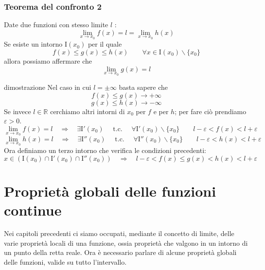 \documentclass[x11names]{article}
\begin{document}
	\begin{center}
		\colorbox{myred}{\begin{minipage}{5.75in}
				\begin{redes}{}
					\subsubsection{Teorema del confronto 2}
					Date due funzioni con stesso limite $l$ :
					\[
					\lim_{x \to x_0} f(x) = l = \lim_{x \to x_0} h(x)
					\]
					Se esiste un intorno $\text{I}(x_0)$ per il quale 
					\[
					f(x) \leq g(x) \leq h(x) \qquad  \forall x \in \text{I}(x_0) \backslash \{x_0\}
					\]
					allora possiamo affermare che 
					\[
					\lim_{x \to x_0} g(x) = l
					\]
				\end{redes}
		\end{minipage}}        
	\end{center}
	\begin{es}{dimostrazione}
		Nel caso in cui $l = \pm \infty$ basta sapere che
		\[
		f(x) \leq g(x) \to +\infty
		\]
		\[
		g(x) \leq h(x) \to -\infty
		\]
		Se invece $l \in \mathbb{R}$ cerchiamo altri intorni di $x_0$ per $f$ e per $h$; per fare ciò prendiamo $\varepsilon > 0$.
		\[
		\lim_{x \to x_0} f(x) = l \quad \Longrightarrow \quad \exists \text{I}'(x_0) \quad \text{ t.c. } \quad \forall \text{I}'(x_0) \backslash \{x_0\} \qquad l - \varepsilon < f(x) < l + \varepsilon
		\]
		\[
		\lim_{x \to x_0} h(x) = l \quad \Longrightarrow \quad \exists \text{I}''(x_0) \quad \text{ t.c. } \quad \forall \text{I}''(x_0) \backslash \{x_0\} \qquad l - \varepsilon < h(x) < l + \varepsilon
		\]
		Ora definiamo un terzo intorno che verifica le condizioni precedenti:
		\[
		x \in (\text{I}(x_0) \cap \text{I}'(x_0) \cap \text{I}''(x_0)) \quad \Longrightarrow \quad l - \varepsilon < f(x)\leq g(x) < h(x) < l + \varepsilon
		\]
	\end{es}
	
	
	
	
	
	
	\newpage
	\section{Proprietà globali delle funzioni continue}
	Nei capitoli precedenti ci siamo occupati, mediante il concetto di limite, delle varie proprietà locali di una funzione, ossia proprietà che valgono in un intorno di un punto della retta reale. Ora è necessario parlare di alcune proprietà globali delle funzioni, valide su tutto l'intervallo.
	
\end{document}
